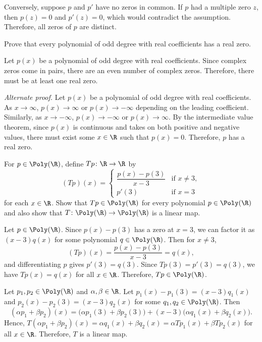 \begin{exc}
\begin{solution}
Conversely, suppose $p$ and $p'$ have no zeros in common. If $p$ had a
multiple zero $z$, then $p(z)=0$ and $p'(z)=0$, which would contradict the
assumption. Therefore, all zeros of $p$ are distinct.
\end{solution}

\begin{exercise}
Prove that every polynomial of odd degree with real coefficients has a real
zero.
\end{exercise}
\begin{solution}
Let $p(x)$ be a polynomial of odd degree with real coefficients. Since complex
zeros come in pairs, there are an even number of complex zeros. Therefore,
there must be at least one real zero.

\emph{Alternate proof.} Let $p(x)$ be a polynomial of odd degree with real
coefficients. As $x\to\infty$, $p(x)\to\infty$ or $p(x)\to-\infty$ depending
on the leading coefficient. Similarly, as $x\to-\infty$, $p(x)\to-\infty$ or
$p(x)\to\infty$. By the intermediate value theorem, since $p(x)$ is continuous
and takes on both positive and negative values, there must exist some
$x\in\R$ such that $p(x)=0$. Therefore, $p$ has a real zero.
\end{solution}

\begin{exercise}
For $p\in\Poly(\R)$, define $Tp\colon\R\to\R$ by
\[ (Tp)(x) = \begin{cases}
  \dfrac{p(x)-p(3)}{x-3} & \text{if } x\ne3,\\[2ex]
  p'(3) & \text{if } x=3
\end{cases} \]
for each $x\in\R$. Show that $Tp\in\Poly(\R)$ for every polynomial
$p\in\Poly(\R)$ and also show that $T\colon\Poly(\R)\to\Poly(\R)$ is a linear
map.
\end{exercise}
\begin{solution}
Let $p\in\Poly(\R)$. Since $p(x)-p(3)$ has a zero at $x=3$, we can factor it
as $(x-3)q(x)$ for some polynomial $q\in\Poly(\R)$. Then for $x\ne3$,
\[ (Tp)(x)=\frac{p(x)-p(3)}{x-3}=q(x), \]
and differentiating $p$ gives $p'(3)=q(3)$. Since $Tp(3)=p'(3)=q(3)$, we have
$Tp(x)=q(x)$ for all $x\in\R$. Therefore, $Tp\in\Poly(\R)$.

Let $p_1,p_2\in\Poly(\R)$ and $\alpha,\beta\in\R$. Let
$p_1(x)-p_1(3)=(x-3)q_1(x)$ and $p_2(x)-p_2(3)=(x-3)q_2(x)$ for some
$q_1,q_2\in\Poly(\R)$. Then
\[ (\alpha p_1+\beta p_2)(x)=\bigl(\alpha p_1(3)+\beta p_2(3)\bigr)
   +(x-3)\bigl(\alpha q_1(x)+\beta q_2(x)\bigr). \]
Hence, $T(\alpha p_1+\beta p_2)(x)=\alpha q_1(x)+\beta q_2(x)
=\alpha Tp_1(x)+\beta Tp_2(x)$ for all $x\in\R$. Therefore, $T$ is a linear
map.
\end{solution}


\end{exc}
